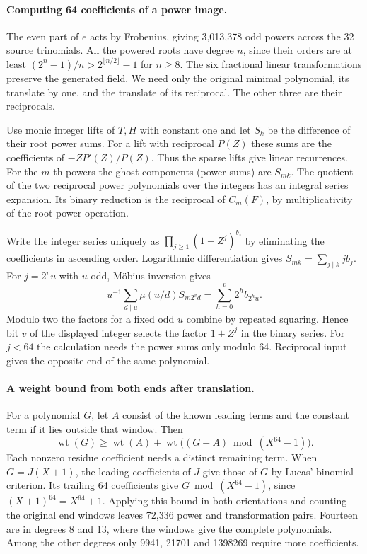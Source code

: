 \documentclass[11pt]{article}
\begin{document}
\paragraph{Computing 64 coefficients of a power image.}
The even part of \(e\) acts by Frobenius, giving 3,013,378 odd
powers across the 32 source trinomials. All the powered roots have
degree \(n\), since their orders are at least
\((2^n-1)/n>2^{\lfloor n/2\rfloor}-1\) for \(n\ge 8\). The six
fractional linear transformations preserve the generated field.
We need only the original minimal polynomial, its translate by
one, and the translate of its reciprocal. The other three are
their reciprocals.

Use monic integer lifts of \(T,H\) with constant one and let
\(S_k\) be the difference of their root power sums. For a lift with
reciprocal \(P(Z)\) these sums are the coefficients of
\(-ZP'(Z)/P(Z)\). Thus the sparse lifts give linear recurrences.
For the \(m\)-th powers the ghost components (power sums) are
\(S_{mk}\). The quotient of the two reciprocal power polynomials
over the integers has an integral series expansion. Its binary
reduction is the reciprocal of \(C_m(F)\), by multiplicativity
of the root-power operation.

Write the integer series uniquely as
\(\prod_{j\ge1}(1-Z^j)^{b_j}\) by eliminating the coefficients
in ascending order. Logarithmic differentiation gives
\(S_{mk}=\sum_{j\mid k} j b_j\). For \(j=2^v u\) with \(u\) odd,
M\"obius inversion gives
\[
 u^{-1}\sum_{d\mid u}\mu(u/d)S_{m2^v d}
     =\sum_{h=0}^v 2^h b_{2^h u}.
\]
Modulo two the factors for a fixed odd \(u\) combine by repeated
squaring. Hence bit \(v\) of the displayed integer selects the
factor \(1+Z^j\) in the binary series. For \(j<64\) the calculation
needs the power sums only modulo 64. Reciprocal input gives the
opposite end of the same polynomial.

\paragraph{A weight bound from both ends after translation.}
For a polynomial \(G\), let \(A\) consist of the known leading
terms and the constant term if it lies outside that window. Then
\[
 \operatorname{wt}(G)\ge \operatorname{wt}(A)
   +\operatorname{wt}\big((G-A)\bmod(X^{64}-1)\big).
\]
Each nonzero residue coefficient needs a distinct remaining term.
When \(G=J(X+1)\), the leading coefficients of \(J\) give those
of \(G\) by Lucas' binomial criterion. Its trailing 64 coefficients
give \(G\bmod(X^{64}-1)\), since \((X+1)^{64}=X^{64}+1\).
Applying this bound in both orientations and counting the original
end windows leaves 72,336 power and transformation pairs. Fourteen
are in degrees 8 and 13, where the windows give the complete
polynomials. Among the other degrees only 9941, 21701 and 1398269
require more coefficients.
\end{document}
